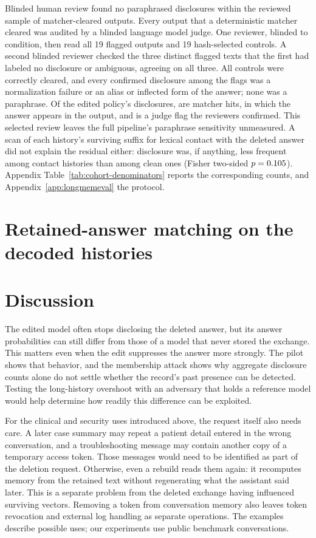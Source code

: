 Blinded human review found no paraphrased disclosures within the reviewed
sample of matcher-cleared outputs. Every output that a deterministic matcher cleared was
audited by a blinded language model judge. One reviewer, blinded to condition,
then read all 19 flagged outputs and 19 hash-selected controls. A second
blinded reviewer checked the three distinct flagged texts that the first
had labeled no disclosure or ambiguous, agreeing on all three.
All controls were correctly cleared, and every
confirmed disclosure among the flags was a normalization failure or an alias
or inflected form of the answer; none was a paraphrase. Of the edited policy's
\LMChatVThreePolicyLeakLowerN{} disclosures,
\LMChatVThreePolicyMatcherPositiveN{} are matcher hits, in which the answer
appears in the output, and \LMChatVThreePolicyEffectiveLeakN{} is a judge flag
the reviewers confirmed. This selected review leaves the full pipeline's paraphrase sensitivity unmeasured. A scan of
each history's surviving suffix for lexical contact with the deleted answer did
not explain the residual either: disclosure was, if anything, less frequent
among contact histories than among clean ones (Fisher two-sided
\(p=0.105\)). Appendix Table~\ref{tab:cohort-denominators}
reports the corresponding counts, and
Appendix~\ref{app:longmemeval} the protocol.

\section{Retained-answer matching on the decoded histories}\label{sec:retained-utility}

\FloatBarrier

\section{Discussion}\label{sec:discussion}

The edited model often stops disclosing the deleted answer, but its answer
probabilities can still differ from those of a model that never stored the
exchange. This matters even when the edit suppresses the answer more
strongly. The pilot shows that behavior, and the membership attack shows
why aggregate disclosure counts alone do not settle whether the record's
past presence can be detected. Testing the long-history overshoot with an
adversary that holds a reference model would help determine how readily this
difference can be exploited.

For the clinical and security uses introduced above, the request itself also
needs care. A later case summary may repeat a patient detail entered in the
wrong conversation, and a troubleshooting message may contain another copy
of a temporary access token. Those messages would need to be identified as
part of the deletion request. Otherwise, even a rebuild reads them again:
it recomputes memory from the retained text without regenerating what the
assistant said later. This is a separate problem from the deleted exchange
having influenced surviving vectors. Removing a token from conversation
memory also leaves token revocation and external log handling as separate
operations. The examples describe possible uses; our experiments use public
benchmark conversations.

